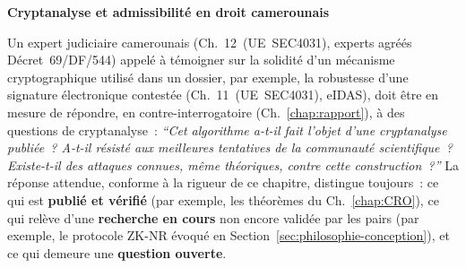 \begin{boxjuris}
\textbf{Cryptanalyse et admissibilité en droit camerounais}

Un expert judiciaire camerounais (Ch.~12~(UE~SEC4031), experts
agréés Décret~69/DF/544) appelé à témoigner sur la solidité d'un
mécanisme cryptographique utilisé dans un dossier, par exemple,
la robustesse d'une signature électronique contestée
(Ch.~11~(UE~SEC4031), eIDAS), doit être en mesure de
répondre, en contre-interrogatoire (Ch.~\ref{chap:rapport}), à des
questions de cryptanalyse~: \textit{``Cet algorithme a-t-il fait
l'objet d'une cryptanalyse publiée~? A-t-il résisté aux meilleures
tentatives de la communauté scientifique~? Existe-t-il des attaques
connues, même théoriques, contre cette construction~?''} La
réponse attendue, conforme à la rigueur de ce chapitre, distingue
toujours~: ce qui est \textbf{publié et vérifié} (par exemple, les
théorèmes du Ch.~\ref{chap:CRO}), ce qui relève d'une
\textbf{recherche en cours} non encore validée par les pairs (par
exemple, le protocole ZK-NR évoqué en
Section~\ref{sec:philosophie-conception}), et ce qui demeure une
\textbf{question ouverte}.
\end{boxjuris}

\separateur

